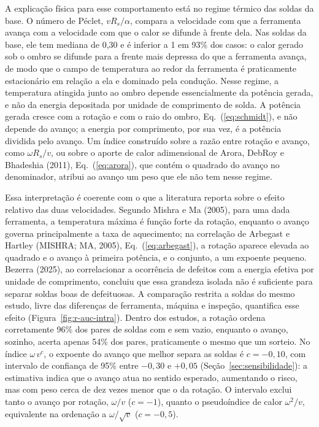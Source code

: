 \documentclass[12pt,openany]{report}
\begin{document}
A explicação física para esse comportamento está no regime térmico das soldas da base. O número de Péclet, $vR_s/\alpha$, compara a velocidade com que a ferramenta avança com a velocidade com que o calor se difunde à frente dela. Nas soldas da base, ele tem mediana de 0,30 e é inferior a 1 em 93\% dos casos: o calor gerado sob o ombro se difunde para a frente mais depressa do que a ferramenta avança, de modo que o campo de temperatura ao redor da ferramenta é praticamente estacionário em relação a ela e dominado pela condução. Nesse regime, a temperatura atingida junto ao ombro depende essencialmente da potência gerada, e não da energia depositada por unidade de comprimento de solda. A potência gerada cresce com a rotação e com o raio do ombro, Eq.~(\ref{eq:schmidt}), e não depende do avanço; a energia por comprimento, por sua vez, é a potência dividida pelo avanço. Um índice construído sobre a razão entre rotação e avanço, como $\omega R_s/v$, ou sobre o aporte de calor adimensional de Arora, DebRoy e Bhadeshia (2011), Eq.~(\ref{eq:arora}), que contém o quadrado do avanço no denominador, atribui ao avanço um peso que ele não tem nesse regime.

Essa interpretação é coerente com o que a literatura reporta sobre o efeito relativo das duas velocidades. Segundo Mishra e Ma (2005), para uma dada ferramenta, a temperatura máxima é função forte da rotação, enquanto o avanço governa principalmente a taxa de aquecimento; na correlação de Arbegast e Hartley (MISHRA; MA, 2005), Eq.~(\ref{eq:arbegast}), a rotação aparece elevada ao quadrado e o avanço à primeira potência, e o conjunto, a um expoente pequeno. Bezerra (2025), ao correlacionar a ocorrência de defeitos com a energia efetiva por unidade de comprimento, concluiu que essa grandeza isolada não é suficiente para separar soldas boas de defeituosas. A comparação restrita a soldas do mesmo estudo, livre das diferenças de ferramenta, máquina e inspeção, quantifica esse efeito (Figura~\ref{fig:r-auc-intra}). Dentro dos estudos, a rotação ordena corretamente 96\% dos pares de soldas com e sem vazio, enquanto o avanço, sozinho, acerta apenas 54\% dos pares, praticamente o mesmo que um sorteio. No índice $\omega\,v^{c}$, o expoente do avanço que melhor separa as soldas é $c = -0{,}10$, com intervalo de confiança de 95\% entre $-0{,}30$ e $+0{,}05$ (Seção~\ref{sec:sensibilidade}): a estimativa indica que o avanço atua no sentido esperado, aumentando o risco, mas com peso cerca de dez vezes menor que o da rotação. O intervalo exclui tanto o avanço por rotação, $\omega/v$ ($c = -1$), quanto o pseudoíndice de calor $\omega^{2}/v$, equivalente na ordenação a $\omega/\sqrt{v}$ ($c = -0{,}5$).
\end{document}
